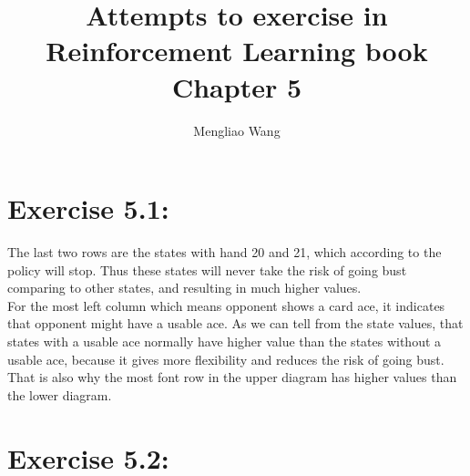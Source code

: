 \documentclass[10pt,letterpaper]{article}
\title{Attempts to exercise in Reinforcement Learning book Chapter 5}
\author{Mengliao Wang}
\begin{document}
\maketitle



\section*{Exercise 5.1: }
\label{5.1}

The last two rows are the states with hand 20 and 21, which according to the policy will stop. Thus these states will never take the risk of going bust comparing to other states, and resulting in much higher values.\\
For the most left column which means opponent shows a card ace, it indicates that opponent might have a usable ace. As we can tell from the state values, that states with a usable ace normally have higher value than the states without a usable ace, because it gives more flexibility and reduces the risk of going bust. That is also why the most font row in the upper diagram has higher values than the lower diagram.

\section*{Exercise 5.2: }
\label{5.2}
\end{document}
